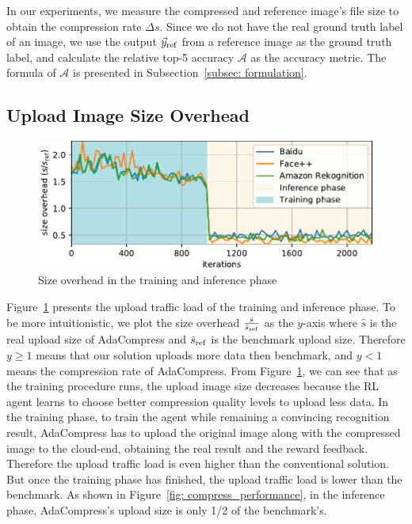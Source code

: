 In our experiments, we measure the compressed and reference image's file size to obtain the compression rate $ \Delta s $. Since we do not have the real ground truth label of an image, we use the output $ \vec{y}_{\rm ref} $ from a reference image as the ground truth label, and calculate the relative top-5 accuracy $ \mathcal{A} $ as the accuracy metric. The formula of $ \mathcal{A} $ is presented in Subsection~\ref{subsec: formulation}.

\subsection{Upload Image Size Overhead}

\begin{figure}[!t]
	\includegraphics[width=0.8\linewidth]{figures/train_steps_new.pdf}
	\caption{Size overhead in the training and inference phase}
	\label{fig: train_steps}
\end{figure}

Figure~\ref{fig: train_steps} presents the upload traffic load of the training and inference phase. To be more intuitionistic, we plot the size overhead {\color{revise2} $ \frac{\hat{s}}{\hat{s}_{\rm ref}} $} as the $ y $-axis where {\color{revise2} $ \hat{s} $} is the real upload size of AdaCompress and {\color{revise2} $ \hat{s}_{\rm ref} $} is the benchmark upload size. Therefore $ y \geq 1 $ means that our solution uploads more data then benchmark, and $ y < 1 $ means the compression rate of AdaCompress. From Figure~\ref{fig: train_steps}, we can see that as the training procedure runs, the upload image size decreases because the RL agent learns to choose better compression quality levels to upload less data. In the training phase, to train the agent while remaining a convincing recognition result, AdaCompress has to upload the original image along with the compressed image to the cloud-end, obtaining the real result and the reward feedback. Therefore the upload traffic load is even higher than the conventional solution. But once the training phase has finished, the upload traffic load is lower than the benchmark. As shown in Figure~\ref{fig: compress_performance}, in the inference phase, AdaCompress's upload size is only 1/2 of the benchmark's. %


